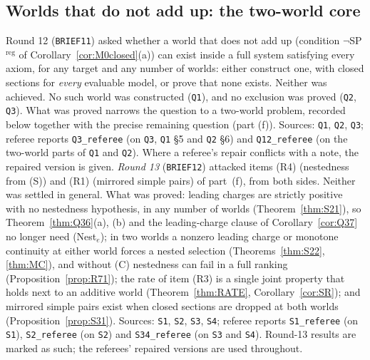 \documentclass[11pt]{article}
\theoremstyle{definition}
\theoremstyle{remark}
\newcommand{\src}[1]{\texttt{#1}}
\begin{document}
\subsection{Worlds that do not add up: the two-world core}\label{sec:open-core}
Round 12 (\src{BRIEF11}) asked whether a world that does not add up (condition $\neg$SP$^{\mathrm{reg}}$ of Corollary~\ref{cor:M0closed}(a)) can exist inside a full system satisfying every axiom, for any target and any number of worlds: either construct one, with closed sections for \emph{every} evaluable model, or prove that none exists. Neither was achieved. No such world was constructed (\src{Q1}), and no exclusion was proved (\src{Q2}, \src{Q3}). What was proved narrows the question to a two-world problem, recorded below together with the precise remaining question (part (f)). Sources: \src{Q1}, \src{Q2}, \src{Q3}; referee reports \src{Q3\_referee} (on \src{Q3}, \src{Q1} \S5 and \src{Q2} \S6) and \src{Q12\_referee} (on the two-world parts of \src{Q1} and \src{Q2}). Where a referee's repair conflicts with a note, the repaired version is given. \emph{Round 13} (\src{BRIEF12}) attacked items (R4) (nestedness from (S)) and (R1) (mirrored simple pairs) of part~(f), from both sides. Neither was settled in general. What was proved: leading charges are strictly positive with no nestedness hypothesis, in any number of worlds (Theorem~\ref{thm:S21}), so Theorem~\ref{thm:Q36}(a), (b) and the leading-charge clause of Corollary~\ref{cor:Q37} no longer need (Nest$_e$); in two worlds a nonzero leading charge or monotone continuity at either world forces a nested selection (Theorems~\ref{thm:S22}, \ref{thm:MC}), and without (C) nestedness can fail in a full ranking (Proposition~\ref{prop:R71}); the rate of item (R3) is a single joint property that holds next to an additive world (Theorem~\ref{thm:RATE}, Corollary~\ref{cor:SR}); and mirrored simple pairs exist when closed sections are dropped at both worlds (Proposition~\ref{prop:S31}). Sources: \src{S1}, \src{S2}, \src{S3}, \src{S4}; referee reports \src{S1\_referee} (on \src{S1}), \src{S2\_referee} (on \src{S2}) and \src{S34\_referee} (on \src{S3} and \src{S4}). Round-13 results are marked as such; the referees' repaired versions are used throughout.
\end{document}
